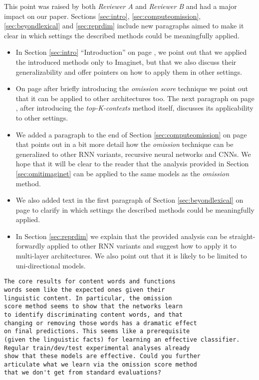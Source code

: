 \documentclass{article}
\begin{document}
This point was raised by both \emph{Reviewer A} and \emph{Reviewer B} and 
had a major impact on our paper.
Sections \ref{sec:intro}, \ref{sec:computeomission}, 
\ref{sec:beyondlexical} and \ref{sec:reprdim} include new paragraphs
aimed to make it clear in which settings the described methods could be meaningfully applied.


\begin{itemize}
  \item In Section \ref{sec:intro} ``Introduction'' on page
    \pageref{generalintro}, we point out that we applied the introduced methods
   only to {\sc Imaginet}, 
  but that we also discuss their generalizability and offer pointers
  on how to apply them in other settings.
  \item On page \pageref{edit:introomissiongeneral} after briefly introducing the 
   \emph{omission score} technique we point out that it can be applied to
   other architectures too. The next paragraph on page
   \pageref{edit:introtopkgeneral}, after introducing the
   \emph{top-K-contexts} method itself, discusses its
  applicability to other settings. 
  \item We added a paragraph to the end of Section \ref{sec:computeomission} on
  page \pageref{edit:omitgeneral} that points out in a bit more detail 
  how the \emph{omission} technique can be generalized to other
  RNN variants, recursive neural networks and CNNs. 
  We hope that it will be clear to the reader that the analysis 
  provided in Section \ref{sec:omitimaginet} can be applied to the 
  same models as the \emph{omission} method.
  \item We also added text in the first paragraph of Section \ref{sec:beyondlexical}
  on page \pageref{edit:beyonlexicalgeneral} to clarify in which settings 
  the described methods could be meaningfully applied.
  \item In Section \ref{sec:reprdim} we explain that the provided 
  analysis can be straight-forwardly applied to other RNN variants and 
  suggest how to apply it to multi-layer architectures. We also point
  out that it is likely to be limited to uni-directional models.
\end{itemize} 


\begin{verbatim}
The core results for content words and functions 
words seem like the expected ones given their 
linguistic content. In particular, the omission
score method seems to show that the networks learn 
to identify discriminating content words, and that
changing or removing those words has a dramatic effect 
on final predictions. This seems like a prerequisite 
(given the linguistic facts) for learning an effective classifier. 
Regular train/dev/test experimental analyses already
show that these models are effective. Could you further 
articulate what we learn via the omission score method 
that we don't get from standard evaluations? 
\end{verbatim}
\end{document}
